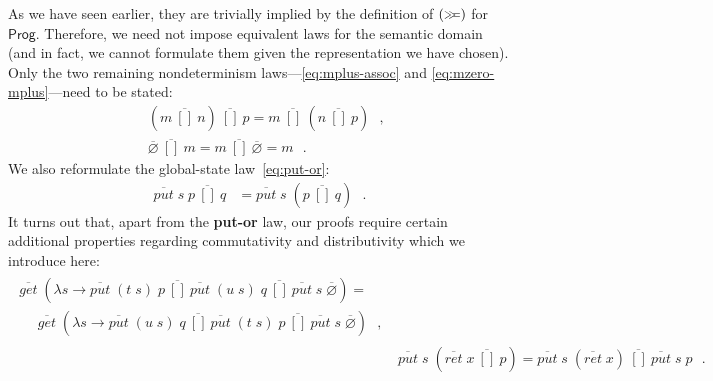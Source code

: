 \documentclass{jfp}
\newcommand{\Conid}[1]{\mathit{#1}}
\newcommand{\Varid}[1]{\mathit{#1}}
\let\Varid\mathit
\let\Conid\mathsf
\begin{document}
As we have seen earlier, they are trivially implied by the definition of \ensuremath{(\mathrel{\hstretch{0.7}{>\!\!>\!\!=}})}
for \ensuremath{\Conid{Prog}}. Therefore, we need not impose equivalent laws for the semantic
domain (and in fact, we cannot formulate them given the representation we
have chosen).
Only the two remaining nondeterminism
laws---\eqref{eq:mplus-assoc} and \eqref{eq:mzero-mplus}---need to be stated:
\begin{align}
  &\ensuremath{(\Varid{m}~\overline{[\!]}~\Varid{n})~\overline{[\!]}~\Varid{p}} = \ensuremath{\Varid{m}~\overline{[\!]}~(\Varid{n}~\overline{[\!]}~\Varid{p})} \mbox{~~,} \\
  &\ensuremath{\overline{\Varid{\varnothing}}~\overline{[\!]}~\Varid{m}} = \ensuremath{\Varid{m}~\overline{[\!]}~\overline{\Varid{\varnothing}}} = \ensuremath{\Varid{m}} \mbox{~~.}
\end{align}
We also reformulate the global-state law~\eqref{eq:put-or}:
\begin{align}
\ensuremath{\overline{\Varid{put}}\;\Varid{s}\;\Varid{p}~\overline{[\!]}~\Varid{q}}        &= \ensuremath{\overline{\Varid{put}}\;\Varid{s}\;(\Varid{p}~\overline{[\!]}~\Varid{q})} \mbox{~~.}\label{eq:put-or-g-d}
\end{align}
It turns out that, apart from the {\bf put-or} law,
our proofs require certain additional properties regarding commutativity and
distributivity which we introduce here:
\begin{align}
\begin{split}
\ensuremath{\overline{\Varid{get}}\;(\lambda \Varid{s}\to \overline{\Varid{put}}\;(\Varid{t}\;\Varid{s})\;\Varid{p}~\overline{[\!]}~\overline{\Varid{put}}\;(\Varid{u}\;\Varid{s})\;\Varid{q}~\overline{[\!]}~\overline{\Varid{put}}\;\Varid{s}\;\overline{\Varid{\varnothing}})} = \\
~~~~~~\ensuremath{\overline{\Varid{get}}\;(\lambda \Varid{s}\to \overline{\Varid{put}}\;(\Varid{u}\;\Varid{s})\;\Varid{q}~\overline{[\!]}~\overline{\Varid{put}}\;(\Varid{t}\;\Varid{s})\;\Varid{p}~\overline{[\!]}~\overline{\Varid{put}}\;\Varid{s}\;\overline{\Varid{\varnothing}})} \mbox {~~,}
\end{split} \label{eq:put-or-comm-g-d} \\
& \ensuremath{\overline{\Varid{put}}\;\Varid{s}\;(\overline{\Varid{ret}}\;\Varid{x}~\overline{[\!]}~\Varid{p})} = \ensuremath{\overline{\Varid{put}}\;\Varid{s}\;(\overline{\Varid{ret}}\;\Varid{x})~\overline{[\!]}~\overline{\Varid{put}}\;\Varid{s}\;\Varid{p}} \mbox{~~.}\label{eq:put-ret-or-g-d}
\end{align}
\end{document}
